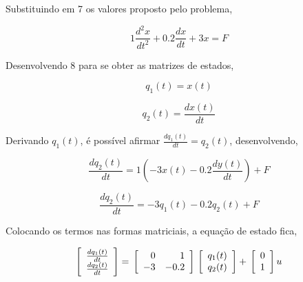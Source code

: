 \documentclass[paper=a4, fontsize=11pt]{article}
\begin{document}
\begin{list}{\textbf{Questão .}}{
\setlength{\labelwidth}{-2mm} \setlength{\parsep}{0mm}
\setlength{\topsep}{0mm} \setlength{\leftmargin}{0mm}}
        Substituindo em 7 os valores proposto pelo problema,

        \begin{equation}
            1 \frac{d^2 x}{d t^2} +  0.2 \frac{d x}{d t} + 3 x = F
        \end{equation}
        
        Desenvolvendo 8 para se obter as matrizes de estados,
        
        \begin{equation}
        	q_1(t) = x(t)
        \end{equation}
        
        \begin{equation}
        	q_2(t) = \frac{d x(t)}{d t}
        \end{equation}
        
        Derivando $q_1(t)$, é possível afirmar $\frac{d q_1(t)}{d t} = q_2(t)$, desenvolvendo,
        
        \begin{equation}
        	\frac{d q_2(t)}{d t} = 1 \left(-3 x(t) - 0.2 \frac{d y(t)}{d t} \right) + F
        \end{equation}
        
        \begin{equation}
        	\frac{d q_2(t)}{d t} = -3 q_1(t) - 0.2 q_2(t) + F
        \end{equation}
        
        Colocando os termos nas formas matriciais, a equação de estado fica,
        
        
        \begin{equation}
          \left[\begin{array}{c}
          \frac{d q_1(t)}{d t} \\
          \frac{d q_2(t)}{d t}
          \end{array}\right] = \\
          \left[\begin{array}{rr}
          0 & 1 \\
          -3 & -0.2
          \end{array}\right]  \\
          \left[\begin{array}{c}
          q_1(t) \\
          q_2(t)
          \end{array}\right] + \\
          \left[\begin{array}{r}
          0 \\
          1
          \end{array}\right] u
        \end{equation}



\end{list}
\end{document}
